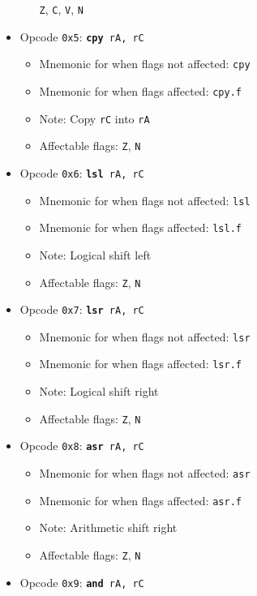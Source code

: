 \documentclass{article}
\begin{document}
\begin{itemize}
\begin{itemize}
				\texttt{Z}, \texttt{C}, \texttt{V}, \texttt{N}
		\end{itemize}
		\item Opcode \texttt{0x5}:
			\texttt{\textbf{cpy} rA, rC}
		\begin{itemize}
			\item Mnemonic for when flags not affected:  \texttt{cpy}
			\item Mnemonic for when flags affected:  \texttt{cpy.f}
			\item Note:  Copy \texttt{rC} into \texttt{rA}
			\item Affectable flags:
				\texttt{Z}, \texttt{N}
		\end{itemize}
		\item Opcode \texttt{0x6}:
			\texttt{\textbf{lsl} rA, rC}
		\begin{itemize}
			\item Mnemonic for when flags not affected:  \texttt{lsl}
			\item Mnemonic for when flags affected:  \texttt{lsl.f}
			\item Note:  Logical shift left
			\item Affectable flags:
				\texttt{Z}, \texttt{N}
		\end{itemize}
		\item Opcode \texttt{0x7}:
			\texttt{\textbf{lsr} rA, rC}
		\begin{itemize}
			\item Mnemonic for when flags not affected:  \texttt{lsr}
			\item Mnemonic for when flags affected:  \texttt{lsr.f}
			\item Note:  Logical shift right
			\item Affectable flags:
				\texttt{Z}, \texttt{N}
		\end{itemize}
		\item Opcode \texttt{0x8}:
			\texttt{\textbf{asr} rA, rC}
		\begin{itemize}
			\item Mnemonic for when flags not affected:  \texttt{asr}
			\item Mnemonic for when flags affected:  \texttt{asr.f}
			\item Note:  Arithmetic shift right
			\item Affectable flags:
				\texttt{Z}, \texttt{N}
		\end{itemize}
		\item Opcode \texttt{0x9}:
			\texttt{\textbf{and} rA, rC}
		\begin{itemize}

\end{itemize}
\end{itemize}
\end{document}
